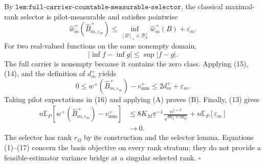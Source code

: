 By \(\texttt{lem:full-carrier-countable-measurable-selector}\), the classical maximal-rank selector is pilot-measurable and satisfies pointwise
\[
\widehat w_m^+(\widehat B_{m,\varepsilon_m}^+)
\le\inf_{[B]_+\in\mathcal B_Z^+}\widehat w_m^+(B)+\varepsilon_m.
\tag{14}
\]
For two real-valued functions on the same nonempty domain,
\[
|\inf f-\inf g|\le\sup|f-g|.
\tag{15}
\]
The full carrier is nonempty because it contains the zero class.  Applying (15), (14), and the definition of \(d_m^+\) yields
\[
0\le w^+(\widehat B_{m,\varepsilon_m}^+)-v_{\mathrm{mm}}^+
\le2d_m^++\varepsilon_m.
\tag{16}
\]
Taking pilot expectations in (16) and applying (A) proves (B).  Finally, (13) gives
\[
\begin{aligned}
n\mathbb E_P\!\left[
w^+(\widehat B_{m,\varepsilon_m}^+)-v_{\mathrm{mm}}^+
\right]
&\le8K_M\underline\pi^{-1}
\frac{n^{1+\beta}}{\sqrt{m_1\wedge m_0}}
+n\mathbb E_P[\varepsilon_m]\\
&\longrightarrow0.
\end{aligned}
\tag{17}
\]
The selector has rank \(r_\Omega\) by its construction and the selector lemma.  Equations (1)--(17) concern the basis objective on every rank stratum; they do not provide a feasible-estimator variance bridge at a singular selected rank. \(\square\)